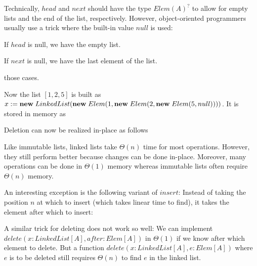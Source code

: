 Technically, $head$ and $next$ should have the type $Elem(A)^?$ to allow for empty lists and the end of the list, respectively.
However, object-oriented programmers usually use a trick where the built-in value $null$ is used:
\begin{compactitem}
 \item If $head$ is null, we have the empty list.
 \item If $next$ is null, we have the last element of the list.
\end{compactitem} those cases.

Now the list $[1,2,5]$ is built as $x:={\rm \bf new}\; LinkedList({\rm \bf new}\; Elem(1, {\rm \bf new}\; Elem(2, {\rm \bf new}\; Elem(5, null))))$.
It is stored in memory as
\begin{amemory}
\alocations
{}
\hline
{}
\hline
{}
\hline
{}
\end{amemory}

Deletion can now be realized in-place as follows
\begin{acode}
\end{acode}

Like immutable lists, linked lists take $\Theta(n)$ time for most operations.
However, they still perform better because changes can be done in-place.
Moreover, many operations can be done in $\Theta(1)$ memory whereas immutable lists often require $\Theta(n)$ memory.

An interesting exception is the following variant of $insert$:
Instead of taking the position $n$ at which to insert (which takes linear time to find), it takes the element after which to insert:
\begin{acode}
\end{acode}

A similar trick for deleting does not work so well: We can implement $delete(x:LinkedList[A], after:Elem[A])$ in $\Theta(1)$ if we know after which element to delete.
But a function $delete(x:LinkedList[A], e:Elem[A])$ where $e$ is to be deleted still requires $\Theta(n)$ to find $e$ in the linked list.

